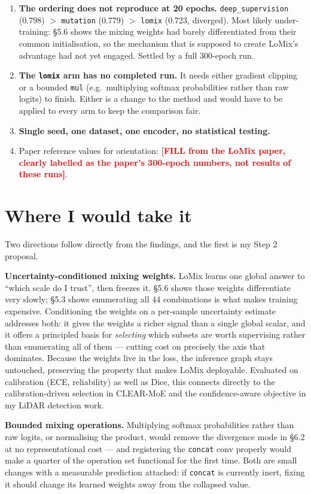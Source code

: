 \documentclass[11pt,a4paper]{article}
\newcommand{\code}[1]{\texttt{\small #1}}
\begin{document}
\begin{enumerate}
\item \textbf{The ordering does not reproduce at 20 epochs.}
\code{deep\_supervision} (0.798) $>$ \code{mutation} (0.779) $>$ \code{lomix}
(0.723, diverged). Most likely under-training: \S5.6 shows the mixing weights
had barely differentiated from their common initialisation, so the mechanism
that is supposed to create LoMix's advantage had not yet engaged. Settled by a
full 300-epoch run.
\item \textbf{The \code{lomix} arm has no completed run.} It needs either
gradient clipping or a bounded \code{mul} (e.g.\ multiplying softmax
probabilities rather than raw logits) to finish. Either is a change to the
method and would have to be applied to every arm to keep the comparison fair.
\item \textbf{Single seed, one dataset, one encoder, no statistical testing.}
\item Paper reference values for orientation:
\textcolor{red}{\textbf{[FILL from the LoMix paper, clearly labelled as the
paper's 300-epoch numbers, not results of these runs]}}.
\end{enumerate}

\section{Where I would take it}

Two directions follow directly from the findings, and the first is my Step 2
proposal.

\textbf{Uncertainty-conditioned mixing weights.} LoMix learns one global answer
to ``which scale do I trust'', then freezes it. \S5.6 shows those weights
differentiate very slowly; \S5.3 shows enumerating all 44 combinations is what
makes training expensive. Conditioning the weights on a per-sample uncertainty
estimate addresses both: it gives the weights a richer signal than a single
global scalar, and it offers a principled basis for \emph{selecting} which
subsets are worth supervising rather than enumerating all of them --- cutting
cost on precisely the axis that dominates. Because the weights live in the loss,
the inference graph stays untouched, preserving the property that makes LoMix
deployable. Evaluated on calibration (ECE, reliability) as well as Dice, this
connects directly to the calibration-driven selection in CLEAR-MoE and the
confidence-aware objective in my LiDAR detection work.

\textbf{Bounded mixing operations.} Multiplying softmax probabilities rather
than raw logits, or normalising the product, would remove the divergence mode in
\S6.2 at no representational cost --- and registering the \code{concat} conv
properly would make a quarter of the operation set functional for the first
time. Both are small changes with a measurable prediction attached: if
\code{concat} is currently inert, fixing it should change its learned weights
away from the collapsed value.
\end{document}
